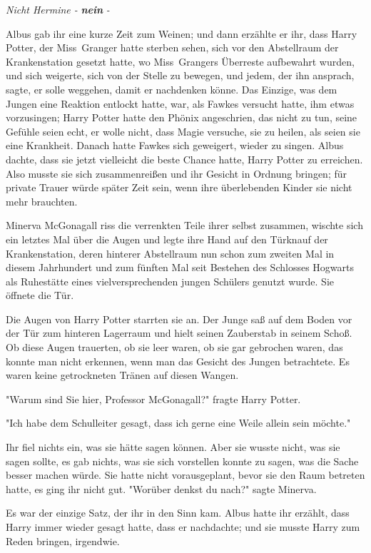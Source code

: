 {\emph{Nicht Hermine -} \textbf{\emph{nein}} \emph{-}

Albus gab ihr eine kurze Zeit zum Weinen; und dann erzählte er ihr, dass Harry Potter, der Miss~Granger hatte sterben sehen, sich vor den Abstellraum der Krankenstation gesetzt hatte, wo Miss~Grangers Überreste aufbewahrt wurden, und sich weigerte, sich von der Stelle zu bewegen, und jedem, der ihn ansprach, sagte, er solle weggehen, damit er nachdenken könne. Das Einzige, was dem Jungen eine Reaktion entlockt hatte, war, als Fawkes versucht hatte, ihm etwas vorzusingen; Harry Potter hatte den Phönix angeschrien, das nicht zu tun, seine Gefühle seien echt, er wolle nicht, dass Magie versuche, sie zu heilen, als seien sie eine Krankheit. Danach hatte Fawkes sich geweigert, wieder zu singen. Albus dachte, dass sie jetzt vielleicht die beste Chance hatte, Harry Potter zu erreichen. Also musste sie sich zusammenreißen und ihr Gesicht in Ordnung bringen; für private Trauer würde später Zeit sein, wenn ihre überlebenden Kinder sie nicht mehr brauchten.

Minerva McGonagall riss die verrenkten Teile ihrer selbst zusammen, wischte sich ein letztes Mal über die Augen und legte ihre Hand auf den Türknauf der Krankenstation, deren hinterer Abstellraum nun schon zum zweiten Mal in diesem Jahrhundert und zum fünften Mal seit Bestehen des Schlosses Hogwarts als Ruhestätte eines vielversprechenden jungen Schülers genutzt wurde. Sie öffnete die Tür.

Die Augen von Harry Potter starrten sie an. Der Junge saß auf dem Boden vor der Tür zum hinteren Lagerraum und hielt seinen Zauberstab in seinem Schoß. Ob diese Augen trauerten, ob sie leer waren, ob sie gar gebrochen waren, das konnte man nicht erkennen, wenn man das Gesicht des Jungen betrachtete. Es waren keine getrockneten Tränen auf diesen Wangen.

"Warum sind Sie hier, Professor McGonagall?" fragte Harry Potter.

"Ich habe dem Schulleiter gesagt, dass ich gerne eine Weile allein sein möchte."

Ihr fiel nichts ein, was sie hätte sagen können. Aber sie wusste nicht, was sie sagen sollte, es gab nichts, was sie sich vorstellen konnte zu sagen, was die Sache besser machen würde. Sie hatte nicht vorausgeplant, bevor sie den Raum betreten hatte, es ging ihr nicht gut. "Worüber denkst du nach?" sagte Minerva.

Es war der einzige Satz, der ihr in den Sinn kam. Albus hatte ihr erzählt, dass Harry immer wieder gesagt hatte, dass er nachdachte; und sie musste Harry zum Reden bringen, irgendwie.

}
